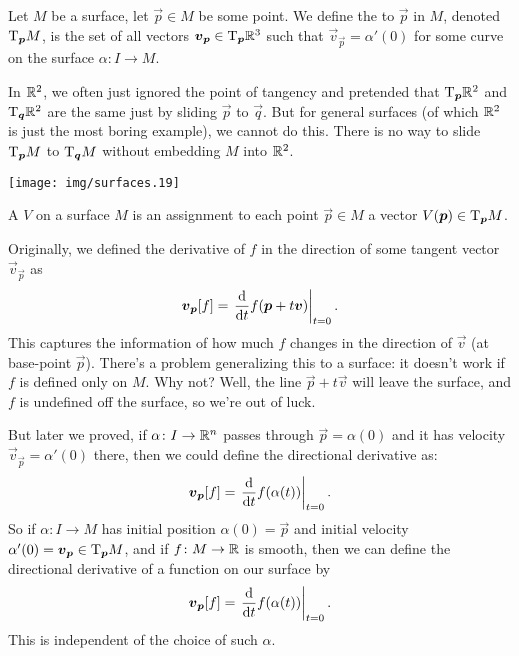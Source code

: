 \begin{definition}
Let $M$ be a surface, let $\vec{p}\in M$ be some point.
We define the  to $\vec{p}$ in $M$, denoted
$\mathrm{T}_{\boldsymbol{p}}M$, is the set of all vectors
$\boldsymbol{v}_{\boldsymbol{p}}\in\mathrm{T}_{\boldsymbol{p}}\mathbb{R}^{3}$ such that
$\vec{v}_{\vec{p}}=\alpha'(0)$ for some curve on the surface $\alpha\colon I\to M$.
\end{definition}

In $\mathbb{R}^{2}$, we often just ignored the point of tangency and pretended
that $\mathrm{T}_{\boldsymbol{p}}\mathbb{R}^{2}$ and $\mathrm{T}_{\boldsymbol{q}}\mathbb{R}^{2}$ are the same just
by sliding $\vec{p}$ to $\vec{q}$. But for general surfaces (of which
$\mathbb{R}^{2}$ is just the most boring example), we cannot do this. There is
no way to slide $\mathrm{T}_{\boldsymbol{p}}M$ to $\mathrm{T}_{\boldsymbol{q}}M$ without embedding $M$
into $\mathbb{R}^{2}$.
\begin{center}
  \texttt{[image: img/surfaces.19]}
\end{center}

\begin{definition}
A  $V$ on a surface $M$ is an assignment to each
point $\vec{p}\in M$ a vector $V(\boldsymbol{p})\in\mathrm{T}_{\boldsymbol{p}}M$.
\end{definition}

\M
Originally, we defined the derivative of $f$ in the direction of some tangent
vector $\vec{v}_{\vec{p}}$ as
\begin{equation}
\boldsymbol{v}_{\boldsymbol{p}}[f] = \left.\frac{\mathrm{d}}{\mathrm{d} t}f(\boldsymbol{p}+t\boldsymbol{v})\right|_{t=0}.
\end{equation}
This captures the information of how much $f$ changes in the direction
of $\vec{v}$ (at base-point $\vec{p}$). There's a problem generalizing
this to a surface: it doesn't work if $f$ is defined only on $M$. Why
not? Well, the line $\vec{p}+t\vec{v}$ will leave the surface, and $f$
is undefined off the surface, so we're out of luck.

But later we proved, if $\alpha\colon I\to\mathbb{R}^{n}$ passes through
$\vec{p}=\alpha(0)$ and it has velocity $\vec{v}_{\vec{p}}=\alpha'(0)$
there, then we could define the directional derivative as:
\begin{equation}
\boldsymbol{v}_{\boldsymbol{p}}[f] = \left.\frac{\mathrm{d}}{\mathrm{d} t}f(\alpha(t))\right|_{t=0}.
\end{equation}
So if $\alpha\colon I\to M$ has initial position $\alpha(0)=\vec{p}$ and
initial velocity $\alpha'(0)=\boldsymbol{v}_{\boldsymbol{p}}\in\mathrm{T}_{\boldsymbol{p}}M$, and
if $f\colon M\to\mathbb{R}$ is smooth, then we can define the directional
derivative of a function on our surface by
\begin{equation}
\boldsymbol{v}_{\boldsymbol{p}}[f] = \left.\frac{\mathrm{d}}{\mathrm{d} t}f(\alpha(t))\right|_{t=0}.
\end{equation}
This is independent of the choice of such $\alpha$.

